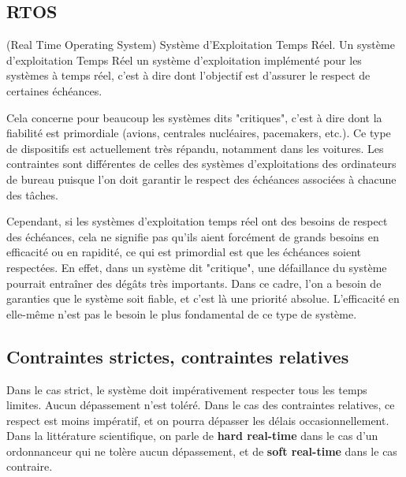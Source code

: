 \documentclass[11pt,a4paper,oneside]{report}
\begin{document}
	\subsection{RTOS}
	(Real Time Operating System) Système d'Exploitation Temps Réel.\medskip
	Un système d'exploitation Temps Réel un système d'exploitation implémenté pour les systèmes 
	à temps réel, c'est à dire dont l'objectif est d'assurer le respect de certaines échéances. 
	
	Cela concerne pour beaucoup les systèmes dits "critiques", c'est à dire dont la fiabilité 
	est primordiale (avions, centrales nucléaires, pacemakers, etc.). Ce type de dispositifs 
	est actuellement très répandu, notamment dans les voitures.\medskip
	Les contraintes sont différentes de celles des systèmes d'exploitations des ordinateurs 
	de bureau puisque l'on doit garantir le respect des échéances associées à chacune des tâches. 
	
	Cependant, si les systèmes d'exploitation temps réel ont des besoins de respect des échéances, 
	cela ne signifie pas qu'ils aient forcément de grands besoins en efficacité ou en rapidité, ce qui 
	est primordial est que les échéances soient respectées. 
	En effet, dans un système dit "critique", une défaillance du système pourrait entraîner des dégâts 
	très importants. 
	Dans ce cadre, l'on a besoin de garanties que le système soit fiable, et c'est là une priorité absolue.
	L'efficacité en elle-même n'est pas le besoin le plus fondamental de ce type de système.\medskip
	
	\subsection{Contraintes strictes, contraintes relatives} 
	Dans le cas strict, le système doit impérativement respecter tous les temps limites. Aucun dépassement n'est toléré. Dans le cas des contraintes relatives, ce respect 
	est moins impératif, et on pourra dépasser les délais occasionnellement. \medskip
	Dans la littérature scientifique, on parle de \textbf{hard real-time} dans le cas d'un ordonnanceur 
	qui ne tolère aucun dépassement, et de \textbf{soft real-time} dans le cas contraire.
	
\end{document}

